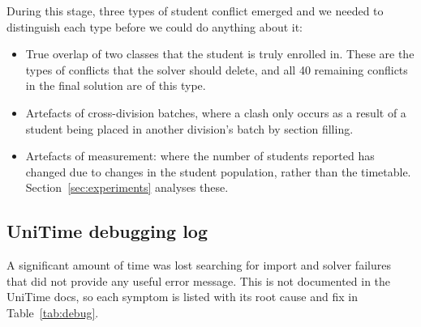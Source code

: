 During this stage, three types of student conflict emerged and we needed to distinguish each type before we could do anything about it:

\begin{itemize}
  \item True overlap of two classes that the student is truly enrolled in. These are the types of conflicts that the solver should delete, and all 40 remaining conflicts in the final solution are of this type.
  \item Artefacts of cross-division batches, where a clash only occurs as a result of a student being placed in another division's batch by section filling.
  \item Artefacts of measurement: where the number of students reported has changed due to changes in the student population, rather than the timetable. Section~\ref{sec:experiments} analyses these.
\end{itemize}

\subsection{UniTime debugging log}

A significant amount of time was lost searching for import and solver failures that did not provide any useful error message.
This is not documented in the UniTime docs, so each symptom is listed with its root cause and fix in Table~\ref{tab:debug}.

